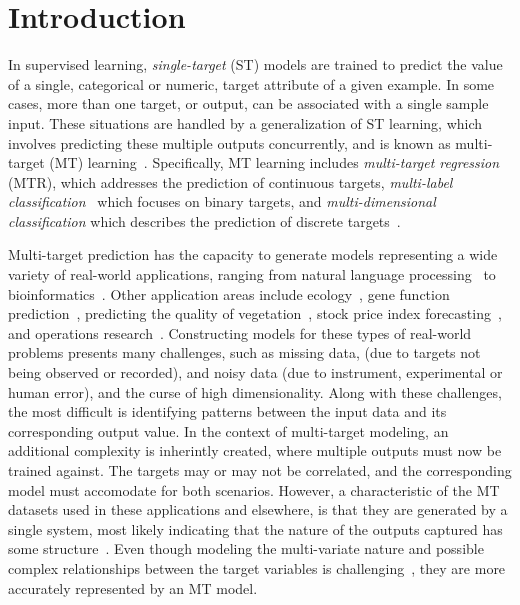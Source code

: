 \documentclass[preprint,12pt]{elsarticle}
\begin{document}
\section{Introduction}
In supervised learning, \textit{single-target} (ST) models are trained to predict the value of a single, categorical or numeric, target attribute of a given example. In some cases, more than one target, or output, can be associated with a single sample input. These situations are handled by a generalization of ST learning, which involves predicting these multiple outputs concurrently, and is known as multi-target (MT) learning~\cite{Aho2012,Borchani2015}. Specifically, MT learning includes \textit{multi-target regression} (MTR), which addresses the prediction of continuous targets, \textit{multi-label classification}~\cite{Zhang20141819} which focuses on binary targets, and \textit{multi-dimensional classification} which describes the prediction of discrete targets~\cite{Borchani2015,Read20141720}. 

Multi-target prediction has the capacity to generate models representing a wide variety of real-world applications, ranging from natural language processing~\cite{Jeong2009} to bioinformatics~\cite{Lui2010}. Other application areas include ecology~\cite{Aho2012}, gene function prediction~\cite{Kocev2015}, predicting the quality of vegetation~\cite{Hadavandi2015-2,Kocev2010}, stock price index forecasting~\cite{Xiong2014}, and operations research~\cite{Borchani2015,Hadavandi2015}. Constructing models for these types of real-world problems presents many challenges, such as missing data, (due to targets not being observed or recorded), and noisy data (due to instrument, experimental or human error), and the curse of high dimensionality. Along with these challenges, the most difficult is identifying patterns between the input data and its corresponding output value. In the context of multi-target modeling, an additional complexity is inherintly created, where multiple outputs must now be trained against. The targets may or may not be correlated, and the corresponding model must accomodate for both scenarios. However, a characteristic of the MT datasets used in these applications and elsewhere, is that they are generated by a single system, most likely indicating that the nature of the outputs captured has some structure~\cite{Hadavandi2015}. Even though modeling the multi-variate nature and possible complex relationships between the target variables is challenging~\cite{Borchani2015}, they are more accurately represented by an MT model.
\end{document}

